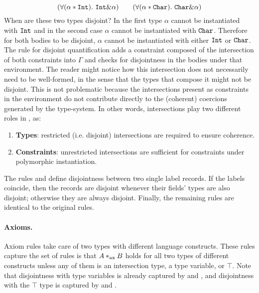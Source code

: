 \[ (\forall (\alpha * \texttt{Int}).~\texttt{Int} \& \alpha) \qquad 
(\forall (\alpha * \texttt{Char}). ~\texttt{Char} \& \alpha) \]
When are these two types disjoint?
In the first type $\alpha$ cannot be instantiated with $\texttt{Int}$ and in
the second case $\alpha$ cannot be instantiated with $\texttt{Char}$.
Therefore for both bodies to be disjoint, $\alpha$ cannot be instantiated with either $\texttt{Int}$ 
or $\texttt{Char}$. 
The rule for disjoint quantification adds a constraint composed of the intersection of both constraints into $\Gamma$ and checks for 
disjointness in the bodies under that environment.
The reader might notice how this intersection does not necessarily need to be well-formed,
in the sense that the types that compose it might not be disjoint.
This is not problematic because the intersections present as constraints in the environment
do not contribute directly to the (coherent) coercions generated by the type-system.
In other words, intersections play two different roles in \name, as:
\begin{enumerate}
\item \textbf{Types}: restricted (i.e. disjoint) intersections are required to ensure coherence.
\item \textbf{Constraints}: unrestricted intersections are sufficient for constraints under 
polymorphic instantiation. 
\end{enumerate}

The rules  and  define disjointness between
two single label records.
If the labels coincide, then the records are disjoint whenever their fields' types are also disjoint;
otherwise they are always disjoint.
Finally, the remaining rules are identical to the original rules. 

\paragraph{Axioms.} Axiom rules take care of two types with different language constructs.
These rules capture the set of rules is that $A *_\textnormal{ax} B$ holds for all 
two types of different constructs unless any of them is an intersection type, a type variable,
or $\top$.
Note that disjointness with type variables is already captured by  and 
, and disjointness with the $\top$ type is captured by 
{} and {}.

